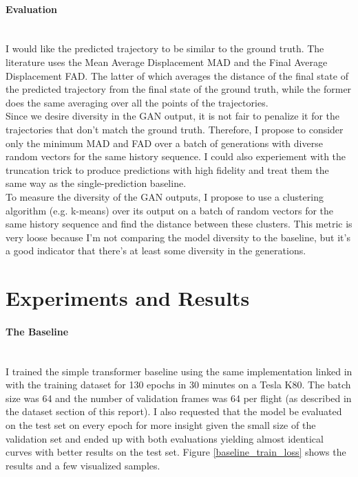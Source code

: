 \documentclass{article}
\begin{document}
\paragraph{Evaluation}$ $
\\I would like the predicted trajectory to be similar to the ground truth. The literature \cite{giuliari2020transformer} uses the Mean Average Displacement MAD and the Final Average Displacement FAD. The latter of which averages the distance of the final state of the predicted trajectory from the final state of the ground truth, while the former does the same averaging over all the points of the trajectories. 
\\Since we desire diversity in the GAN output, it is not fair to penalize it for the trajectories that don't match the ground truth. Therefore, I propose to consider only the minimum MAD and FAD over a batch of generations with diverse random vectors for the same history sequence. I could also experiement with the truncation trick to produce predictions with high fidelity and treat them the same way as the single-prediction baseline.  
\\To measure the diversity of the GAN outputs, I propose to use a clustering algorithm (e.g. k-means) over its output on a batch of random vectors for the same history sequence and find the distance between these clusters.  This metric is very loose because I'm not comparing the model diversity to the baseline, but it's a good indicator that there's at least some diversity in the generations. 

\section{Experiments and Results}
\paragraph{The Baseline}$ $
\\I trained the simple transformer baseline using the same implementation linked in \cite{giuliari2020transformer} with the training dataset for 130 epochs in 30 minutes on a Tesla K80. The batch size was 64 and the number of validation frames was 64 per flight (as described in the dataset section of this report).  I also requested that the model be evaluated on the test set on every epoch for more insight given the small size of the validation set and ended up with both evaluations yielding almost identical curves with better results on the test set.  Figure \ref{baseline_train_loss} shows the results and a few visualized samples. 
\end{document}
